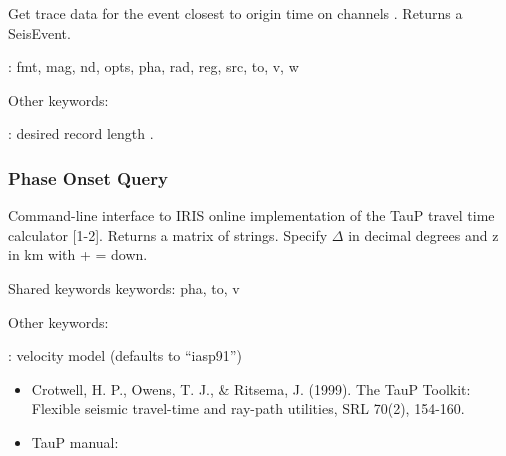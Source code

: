 \documentclass[letterpaper,11pt,english]{sphinxmanual}
\begin{document}
Get trace data for the event closest to origin time  on channels .
Returns a SeisEvent.

\begin{DUlineblock}{0em}
\item[] {\hyperref[\detokenize{src/Appendices/keywords:dkw}]{}}: fmt, mag, nd, opts, pha, rad, reg, src, to, v, w
\item[] Other keywords:
\item[] : desired record length .
\end{DUlineblock}


\subsubsection{Phase Onset Query}
\label{\detokenize{src/Submodules/quake:phase-onset-query}}

\begin{fulllineitems}
\label{\detokenize{src/Submodules/quake:get_pha}}
\end{fulllineitems}


Command-line interface to IRIS online implementation of the TauP travel time
calculator {[}1-2{]}. Returns a matrix of strings. Specify \(\Delta\) in decimal degrees
and z in km with + = down.

\begin{DUlineblock}{0em}
\item[] Shared keywords keywords: pha, to, v
\item[] Other keywords:
\item[] : velocity model (defaults to “iasp91”)
\end{DUlineblock}

\begin{itemize}
\item {} 
Crotwell, H. P., Owens, T. J., \& Ritsema, J. (1999). The TauP Toolkit: Flexible seismic travel-time and ray-path utilities, SRL 70(2), 154-160.

\item {} 
TauP manual: 

\end{itemize}
\end{document}
